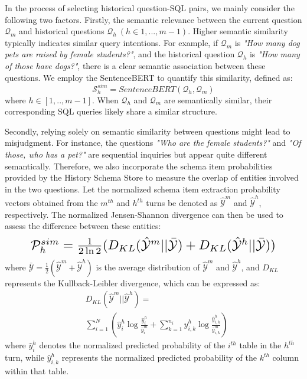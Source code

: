 \documentclass[11pt]{article}
\begin{document}
In the process of selecting historical question-SQL pairs, we mainly consider the following two factors. Firstly, the semantic relevance between the current question $\mathcal{Q}_{m}$ and historical questions $\mathcal{Q}_{h} \ (h \in 1,...,m-1)$. Higher semantic similarity typically indicates similar query intentions. For example, if $\mathcal{Q}_{m}$ is \textit{"How many dog pets are raised by female students?"}, and the historical question $\mathcal{Q}_{h}$ is \textit{"How many of those have dogs?"}, there is a clear semantic association between these questions. We employ the SentenceBERT \cite{reimers-gurevych-2019-sentence} to quantify this similarity, defined as:
\begin{equation}
    \mathcal{S}^{sim}_{h} = SentenceBERT(\mathcal{Q}_{h}, \mathcal{Q}_{m})
\end{equation}
where $ h\in[1,..,m-1] $. When $ \mathcal{Q}_{h} $ and $ \mathcal{Q}_{m} $ are semantically similar, their corresponding SQL queries likely share a similar structure.

Secondly, relying solely on semantic similarity between questions might lead to misjudgment. For instance, the questions \textit{"Who are the female students?"} and \textit{"Of those, who has a pet?"} are sequential inquiries but appear quite different semantically. Therefore, we also incorporate the schema item probabilities provided by the History Schema Store to measure the overlap of entities involved in the two questions. Let the normalized schema item extraction probability vectors obtained from the $ m^{th} $ and $ h^{th} $ turns be denoted as $\hat{\mathcal{Y}}^{m}$ and $\hat{\mathcal{Y}}^{h}$, respectively. The normalized Jensen-Shannon divergence can then be used to assess the difference between these entities:
\begin{equation}
    \resizebox{.89\hsize}{!}{
        $\mathcal{P}^{sim}_{h} = \frac{1}{2\ln{2}} (D_{KL}(\hat{\mathcal{Y}}^{m} || \bar{\mathcal{Y}}) + D_{KL}(\hat{\mathcal{Y}}^{h} || \bar{\mathcal{Y}}))$
    }
\end{equation}
where $\bar{\mathcal{Y}} = \frac{1}{2} (\hat{\mathcal{Y}}^{m} + \hat{\mathcal{Y}}^{h})$ is the average distribution of $\hat{\mathcal{Y}}^{m}$ and $\hat{\mathcal{Y}}^{h}$, and $ D_{KL} $ represents the Kullback-Leibler divergence, which can be expressed as:
\begin{equation}
    \begin{aligned}
        &D_{KL}(\hat{\mathcal{Y}}^{m} || \hat{\mathcal{Y}}^{h}) = \\
        &\sum_{i=1}^{N} \left( \hat{y}_{i}^{h} \log \frac{\hat{y}_{i}^{h}}{\hat{y}_{i}^{m}} + \sum_{k=1}^{n_{i}} \hat{y}_{i,k}^{h} \log \frac{\hat{y}_{i,k}^{h}}{\hat{y}_{i,k}^{m}} \right)
    \end{aligned}
\end{equation}
where $\hat{y}_{i}^{h}$ denotes the normalized predicted probability of the $ i^{th} $ table in the $ h^{th} $ turn, while $\hat{y}_{i,k}^{h}$ represents the normalized predicted probability of the $ k^{th} $ column within that table.
\end{document}

